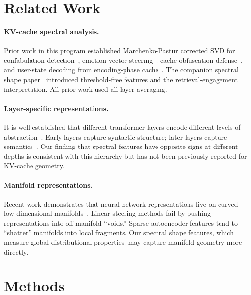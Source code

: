 \documentclass[11pt,a4paper]{article}
\begin{document}
\section{Related Work}
\label{sec:related}

\paragraph{KV-cache spectral analysis.}
Prior work in this program established Marchenko-Pastur corrected SVD
for confabulation detection~\citep{lyra_p2}, emotion-vector
steering~\citep{lyra_p6}, cache obfuscation
defense~\citep{lyra_p7}, and user-state decoding from encoding-phase
cache~\citep{lyra_p4}. The companion spectral shape
paper~\citep{lyra_spectral} introduced threshold-free features and the
retrieval-engagement interpretation. All prior work used all-layer
averaging.

\paragraph{Layer-specific representations.}
It is well established that different transformer layers encode
different levels of abstraction~\citep{tenney2019bert}. Early layers
capture syntactic structure; later layers capture
semantics~\citep{jawahar2019does}. Our finding that spectral features
have opposite signs at different depths is consistent with this
hierarchy but has not been previously reported for KV-cache geometry.

\paragraph{Manifold representations.}
Recent work demonstrates that neural network representations live on
curved low-dimensional manifolds~\citep{goodfire2026}. Linear
steering methods fail by pushing representations into off-manifold
``voids.'' Sparse autoencoder features tend to ``shatter'' manifolds
into local fragments. Our spectral shape features, which measure
global distributional properties, may capture manifold geometry more
directly.

\section{Methods}
\label{sec:methods}
\end{document}
